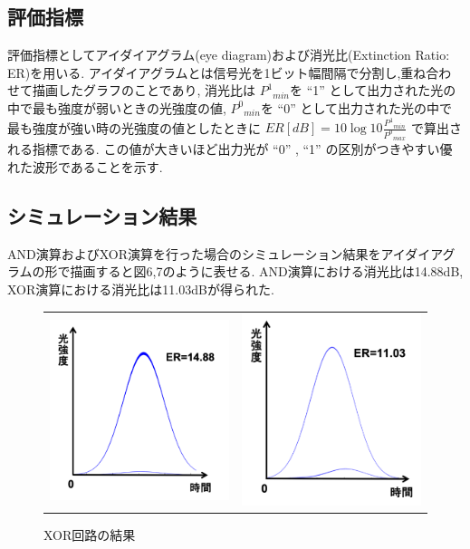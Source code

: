 \documentclass[dvipdfmx]{ujarticle}
\begin{document}
  \subsection{評価指標}
    評価指標としてアイダイアグラム(eye diagram)および消光比(Extinction Ratio: ER)を用いる.
    アイダイアグラムとは信号光を1ビット幅間隔で分割し,重ね合わせて描画したグラフのことであり,
    消光比は ${P^1}_{min}$を “1” として出力された光の中で最も強度が弱いときの光強度の値,
    ${P^0}_{min}$を “0” として出力された光の中で最も強度が強い時の光強度の値としたときに
    $ER[dB] = 10 \log{10}{\frac{{P^1}_{min}}{{P^0}_{max}}}$ で算出される指標である.
    この値が大きいほど出力光が “0” , “1” の区別がつきやすい優れた波形であることを示す.

  \subsection{シミュレーション結果}
    AND演算およびXOR演算を行った場合のシミュレーション結果をアイダイアグラムの形で描画すると図6,7のように表せる.
    AND演算における消光比は14.88dB, XOR演算における消光比は11.03dBが得られた.
    \begin{figure}[H]
      \begin{tabular}{cc}
        \begin{minipage}[t]{0.45\hsize}
          \centering
          \includegraphics[width=7cm]{images/AND_RESULT.png}
          \caption{AND回路の結果}
        \end{minipage} &
        \begin{minipage}[t]{0.45\hsize}
          \centering
          \includegraphics[width=7cm]{images/XOR_RESULT.png}
          \caption{XOR回路の結果}
        \end{minipage}
      \end{tabular}
    \end{figure}
\end{document}

